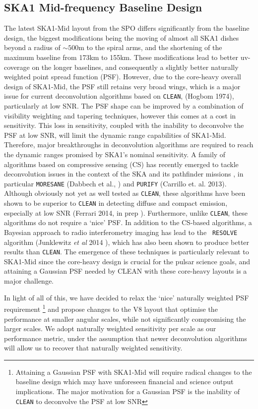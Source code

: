 \documentclass[sfheadings,a4paper,times,9pt,floats,floatfix]{article}
\begin{document}
\subsection{SKA1 Mid-frequency Baseline Design}\label{sec:BL}
The latest SKA1-Mid layout from the SPO differs significantly from the
baseline design, the biggest modifications being the moving of almost all
SKA1 dishes beyond a radius of $\sim500$m to the spiral arms, and the
shortening of the maximum baseline
from 173km to 155km. These modifications lead to better uv-coverage on
the longer baselines, and consequently a
slightly better naturally weighted point spread function (PSF).
However, due to the
core-heavy overall design of SKA1-Mid, the
PSF still retains very broad wings, which is a major issue for current
deconvolution algorithms based on {\tt CLEAN}, (Hogbom 1974),
particularly at low SNR. The PSF shape can be improved by a
combination of visibility weighting and tapering techniques, however
this comes at a cost in sensitivity. This loss in sensitivity, coupled
with the
inability to deconvolve the PSF at low SNR, will limit the dynamic
range capabilities of SKA1-Mid. Therefore, major breakthroughs in
deconvolution algorithms are required to reach the dynamic ranges
promised by SKA1's nominal sensitivity. A family of algorithms based
on compressive sensing (CS) has recently emerged to tackle
deconvolution issues in the context of the SKA and its pathfinder
missions \cite{cs-ska}, in particular {\tt MORESANE} (Dabbech et al., \cite{mrs1,mrs2}) and {\tt PURIFY} (Carrillo et.
al. 2013).
Although obviously not yet as well tested as {\tt CLEAN}, these algorithms
have been shown to be superior to {\tt CLEAN} in detecting diffuse and
compact emission, especially at low SNR (Ferrari 2014, in prep \cite{ferrari}). Furthermore,
unlike {\tt CLEAN}, these algorithms do not
require a `nice' PSF. In addition to the CS-based algorithms, a
Bayesian approach to radio interferometry imaging has lead to the {\tt
RESOLVE} algorithm (Junklewitz {\it et al} 2014
\cite{resolve}), which has also been shown to produce better
results than {\tt CLEAN}. The emergence of these techniques is
particularly relevant to
SKA1-Mid since the core-heavy design is crucial for the pulsar science
goals, and attaining a Gaussian PSF needed by CLEAN with these
core-heavy layouts is a major challenge.

In light of all of this, we have decided to relax the `nice' naturally
weighted PSF requirement \footnote{Attaining a Gaussian PSF with
SKA1-Mid will require radical changes to the baseline design which may
have unforeseen financial and science output implications. The major
motivation for a Gaussian PSF is the inability of {\tt CLEAN} to
deconvolve the PSF at low SNR} and propose changes to the V8 layout
that optimise the performance at smaller angular scales, while not
significantly compromising the larger scales. We adopt naturally
weighted sensitivity per scale as our performance metric, under the
assumption that newer deconvolution algorithms will allow us to
recover that naturally weighted sensitivity.
\end{document}
